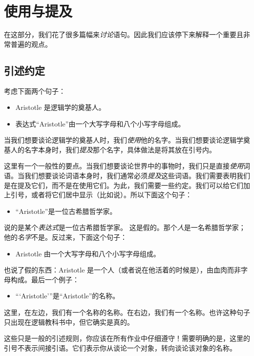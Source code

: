 \chapter{使用与提及}\label{s:UseMention}
在这部分，我们花了很多篇幅来\emph{讨论}语句。因此我们应该停下来解释一个重要且非常普遍的观点。

\section{引述约定}
考虑下面两个句子：
\begin{itemize}
		\item Aristotle 是逻辑学的奠基人。
		\item 表达式“Aristotle”由一个大写字母和八个小写字母组成。
	\end{itemize}

当我们想要谈论逻辑学的奠基人时，我们\emph{使用}他的名字。当我们想要谈论逻辑学奠基人的名字本身时，我们\emph{提及}那个名字，具体做法是将其放在引号内。

这里有一个一般性的要点。当我们想要谈论世界中的事物时，我们只是直接\emph{使用}词语。当我们想要谈论词语本身时，我们通常必须\emph{提及}这些词语。我们需要表明我们是在提及它们，而不是在使用它们。为此，我们需要一些约定。我们可以给它们加上引号，或者将它们居中显示（比如说）。所以下面这个句子：
\begin{itemize}
		\item“Aristotle”是一位古希腊哲学家。
	\end{itemize}

说的是某个\emph{表达式}是一位古希腊哲学家。
这是假的。那个\emph{人}是一名希腊哲学家；他的\emph{名字}不是。反过来，下面这个句子：
\begin{itemize}
		\item Aristotle 由一个大写字母和八个小写字母组成。
	\end{itemize}

也说了假的东西：Aristotle 是一个人（或者说在他活着的时候是），由血肉而非字母构成。最后一个例子：
\begin{itemize}
		\item“‘Aristotle’”是“Aristotle”的名称。
	\end{itemize}

这里，在左边，我们有一个名称的名称。在右边，我们有一个名称。也许这种句子只出现在逻辑教科书中，但它确实是真的。

这些只是一般的引述规则，你应该在所有作业中仔细遵守！需要明确的是，这里的引号不表示间接引语。它们表示你从谈论一个对象，转向谈论该对象的名称。

